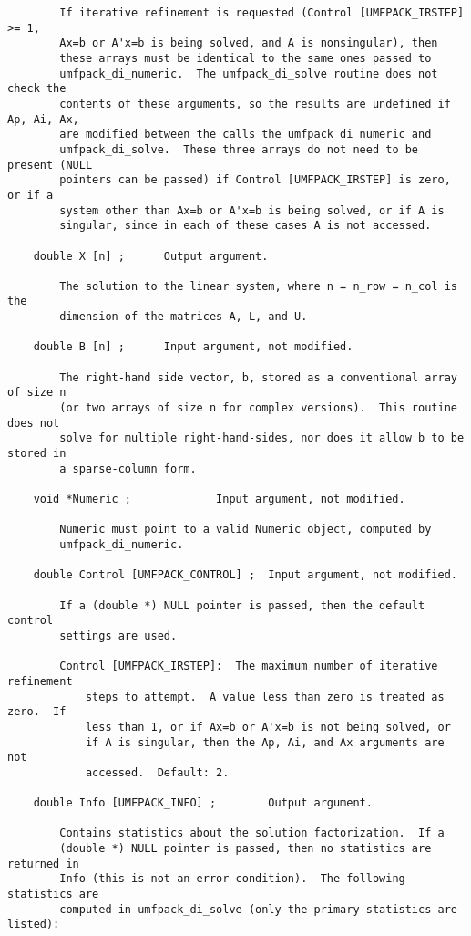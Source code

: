 \documentclass[11pt]{article}
\begin{document}
{\begin{verbatim}
        If iterative refinement is requested (Control [UMFPACK_IRSTEP] >= 1,
        Ax=b or A'x=b is being solved, and A is nonsingular), then
        these arrays must be identical to the same ones passed to
        umfpack_di_numeric.  The umfpack_di_solve routine does not check the
        contents of these arguments, so the results are undefined if Ap, Ai, Ax,
        are modified between the calls the umfpack_di_numeric and
        umfpack_di_solve.  These three arrays do not need to be present (NULL
        pointers can be passed) if Control [UMFPACK_IRSTEP] is zero, or if a
        system other than Ax=b or A'x=b is being solved, or if A is
        singular, since in each of these cases A is not accessed.

    double X [n] ;      Output argument.

        The solution to the linear system, where n = n_row = n_col is the
        dimension of the matrices A, L, and U.

    double B [n] ;      Input argument, not modified.

        The right-hand side vector, b, stored as a conventional array of size n
        (or two arrays of size n for complex versions).  This routine does not
        solve for multiple right-hand-sides, nor does it allow b to be stored in
        a sparse-column form.

    void *Numeric ;             Input argument, not modified.

        Numeric must point to a valid Numeric object, computed by
        umfpack_di_numeric.

    double Control [UMFPACK_CONTROL] ;  Input argument, not modified.

        If a (double *) NULL pointer is passed, then the default control
        settings are used.

        Control [UMFPACK_IRSTEP]:  The maximum number of iterative refinement
            steps to attempt.  A value less than zero is treated as zero.  If
            less than 1, or if Ax=b or A'x=b is not being solved, or
            if A is singular, then the Ap, Ai, and Ax arguments are not
            accessed.  Default: 2.

    double Info [UMFPACK_INFO] ;        Output argument.

        Contains statistics about the solution factorization.  If a
        (double *) NULL pointer is passed, then no statistics are returned in
        Info (this is not an error condition).  The following statistics are
        computed in umfpack_di_solve (only the primary statistics are listed):


\end{verbatim}}
\end{document}
